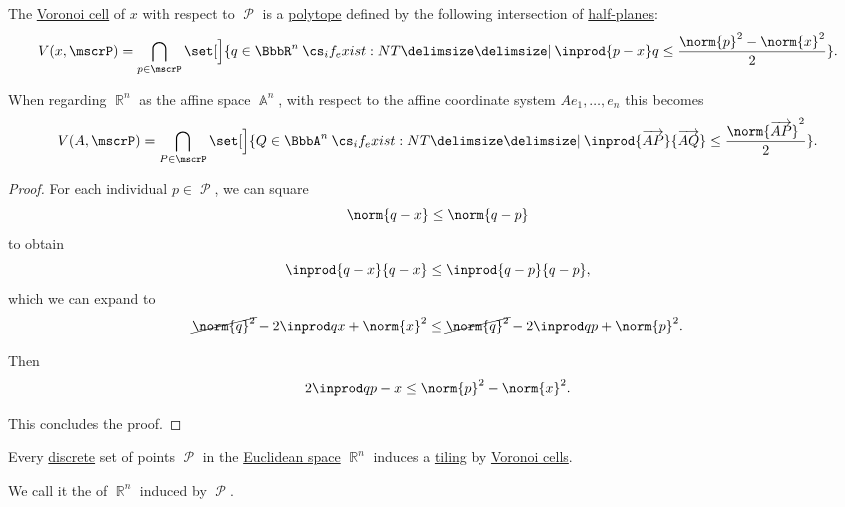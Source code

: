 \begin{proposition}\label{thm:voronoi_cell_polygon}
  The \hyperref[def:voronoi_cell]{Voronoi cell} of \( x \) with respect to \( \mscrP \) is a \hyperref[def:polytope]{polytope} defined by the following intersection of \hyperref[def:half_space]{half-planes}:
  \begin{equation}\label{eq:thm:voronoi_cell_polygon}
    V(x, \mscrP) = \bigcap_{p \in \mscrP} \set[\Big]{ q \in \BbbR^n \given* \inprod { p - x } q \leq \frac {\norm{p}^2 - \norm{x}^2} 2 }.
  \end{equation}

  When regarding \( \BbbR^n \) as the affine space \( \BbbA^n \), with respect to the affine coordinate system \( Ae_1,\ldots,e_n \) this becomes
  \begin{equation}\label{eq:thm:voronoi_cell_polygon/affine}
    V(A, \mscrP) = \bigcap_{P \in \mscrP} \set[\Big]{ Q \in \BbbA^n \given* \inprod {\vect{AP}} {\vect{AQ}} \leq \frac {\norm{\vect{AP}}^2} 2 }.
  \end{equation}
\end{proposition}
\begin{proof}
  For each individual \( p \in \mscrP \), we can square
  \begin{equation*}
    \norm{ q - x } \leq \norm{ q - p }
  \end{equation*}
  to obtain
  \begin{equation*}
    \inprod { q - x } { q - x } \leq \inprod { q - p } { q - p },
  \end{equation*}
  which we can expand to
  \begin{equation*}
    \cancel{\norm{q}^2} - 2 \inprod q x + \norm{x}^2 \leq \cancel{\norm{q}^2} - 2 \inprod q p + \norm{p}^2.
  \end{equation*}

  Then
  \begin{equation*}
    2 \inprod q { p - x } \leq \norm{p}^2 - \norm{x}^2.
  \end{equation*}

  This concludes the proof.
\end{proof}

\begin{definition}\label{def:voronoi_tiling}\mimprovised
  Every \hyperref[def:discrete_set]{discrete} set of points \( \mscrP \) in the \hyperref[def:euclidean_space]{Euclidean space} \( \BbbR^n \) induces a \hyperref[def:topological_space_tiling]{tiling} by \hyperref[def:voronoi_cell]{Voronoi cells}.

  We call it the  of \( \BbbR^n \) induced by \( \mscrP \).
\end{definition}


